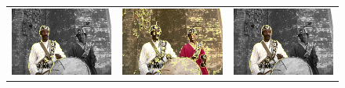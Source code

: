 \documentclass[smallextended]{svjour3}       %
\begin{document}
{{\begin{figure}[ht!]
\begin{tabular}{ccc}
		\includegraphics[scale=0.2]{segmentation_bc_man_gc-seg.png} &
		\includegraphics[scale=0.2]{segmentation_schoenemann_man_man-seg.png} &
		\includegraphics[scale=0.2]{segmentation_bc_man_corrected-seg.png}\\		

\end{tabular}
\end{figure}}}
\end{document}
